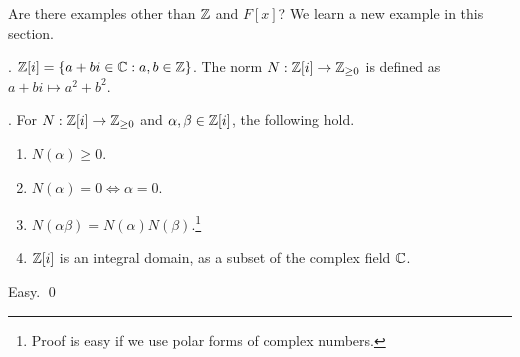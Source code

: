 \pagebreak


Are there examples other than \(\mathbb{Z}\) and \(F[x]\)? We learn a new example in this section.

.  \(\mathbb{Z}[i] = \{a + bi \in \mathbb{C} : a, b \in \mathbb{Z}\}\). The norm \(N : \mathbb{Z}[i] \rightarrow \mathbb{Z}_{\geq 0}\) is defined as \(a + bi \mapsto a^2 + b^2\).

\lemma. For \(N : \mathbb{Z}[i] \rightarrow \mathbb{Z}_{\geq 0}\) and \(\alpha, \beta \in \mathbb{Z}[i]\), the following hold.
\begin{enumerate}
    \item \(N(\alpha) \geq 0\).
    \item \(N(\alpha) = 0 \iff \alpha = 0\).
    \item \(N(\alpha\beta) = N(\alpha)N(\beta)\).\footnote{Proof is easy if we use polar forms of complex numbers.}
    \item \(\mathbb{Z}[i]\) is an integral domain, as a subset of the complex field \(\mathbb{C}\).
\end{enumerate}

\pf Easy. \qed

\smallskip
